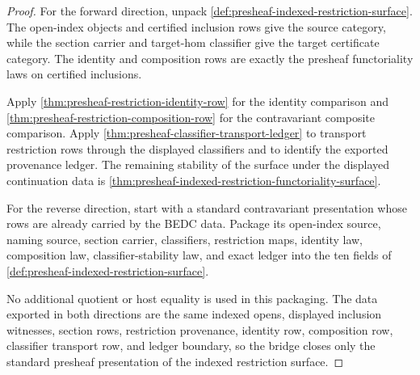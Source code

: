 \begin{proof}
For the forward direction, unpack \autoref{def:presheaf-indexed-restriction-surface}. The open-index objects and certified inclusion rows give the source category, while the section carrier and target-hom classifier give the target certificate category. The identity and composition rows are exactly the presheaf functoriality laws on certified inclusions.

Apply \autoref{thm:presheaf-restriction-identity-row} for the identity comparison and \autoref{thm:presheaf-restriction-composition-row} for the contravariant composite comparison. Apply \autoref{thm:presheaf-classifier-transport-ledger} to transport restriction rows through the displayed classifiers and to identify the exported provenance ledger. The remaining stability of the surface under the displayed continuation data is \autoref{thm:presheaf-indexed-restriction-functoriality-surface}.

For the reverse direction, start with a standard contravariant presentation whose rows are already carried by the BEDC data. Package its open-index source, naming source, section carrier, classifiers, restriction maps, identity law, composition law, classifier-stability law, and exact ledger into the ten fields of \autoref{def:presheaf-indexed-restriction-surface}.

No additional quotient or host equality is used in this packaging. The data exported in both directions are the same indexed opens, displayed inclusion witnesses, section rows, restriction provenance, identity row, composition row, classifier transport row, and ledger boundary, so the bridge closes only the standard presheaf presentation of the indexed restriction surface.
\end{proof}

